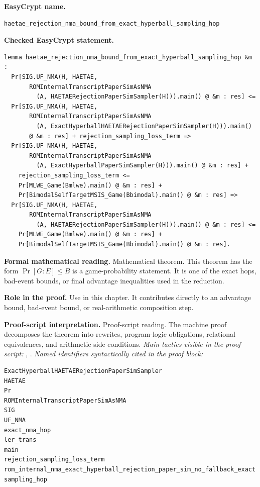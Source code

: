 \begin{formaltheorem}
\noindent\textbf{EasyCrypt name.}
\begin{lstlisting}[language=EasyCrypt,basicstyle=\ttfamily\scriptsize]
haetae_rejection_nma_bound_from_exact_hyperball_sampling_hop
\end{lstlisting}
\noindent\textbf{Checked EasyCrypt statement.}
\begin{lstlisting}[language=EasyCrypt,basicstyle=\ttfamily\scriptsize]
lemma haetae_rejection_nma_bound_from_exact_hyperball_sampling_hop &m :
  Pr[SIG.UF_NMA(H, HAETAE,
       ROMInternalTranscriptPaperSimAsNMA
         (A, HAETAERejectionPaperSimSampler(H))).main() @ &m : res] <=
  Pr[SIG.UF_NMA(H, HAETAE,
       ROMInternalTranscriptPaperSimAsNMA
         (A, ExactHyperballHAETAERejectionPaperSimSampler(H))).main()
       @ &m : res] + rejection_sampling_loss_term =>
  Pr[SIG.UF_NMA(H, HAETAE,
       ROMInternalTranscriptPaperSimAsNMA
         (A, ExactHyperballPaperSimSampler(H))).main() @ &m : res] +
    rejection_sampling_loss_term <=
    Pr[MLWE_Game(Bmlwe).main() @ &m : res] +
    Pr[BimodalSelfTargetMSIS_Game(Bbimodal).main() @ &m : res] =>
  Pr[SIG.UF_NMA(H, HAETAE,
       ROMInternalTranscriptPaperSimAsNMA
         (A, HAETAERejectionPaperSimSampler(H))).main() @ &m : res] <=
    Pr[MLWE_Game(Bmlwe).main() @ &m : res] +
    Pr[BimodalSelfTargetMSIS_Game(Bbimodal).main() @ &m : res].
\end{lstlisting}
\noindent\textbf{Formal mathematical reading.}
Mathematical theorem. This theorem has the form \(\Pr[G:E] \le B\) is a game-probability statement.  It is one of the exact hops, bad-event bounds, or final advantage inequalities used in the reduction.

\noindent\textbf{Role in the proof.}
Use in this chapter. It contributes directly to an advantage bound, bad-event bound, or real-arithmetic composition step.

\noindent\textbf{Proof-script interpretation.}
Proof-script reading. The machine proof decomposes the theorem into rewrites, program-logic obligations, relational equivalences, and arithmetic side conditions.
\emph{Main tactics visible in the proof script:} , .
\emph{Named identifiers syntactically cited in the proof block:}
\begin{lstlisting}[language=EasyCrypt,basicstyle=\ttfamily\scriptsize]
ExactHyperballHAETAERejectionPaperSimSampler
HAETAE
Pr
ROMInternalTranscriptPaperSimAsNMA
SIG
UF_NMA
exact_nma_hop
ler_trans
main
rejection_sampling_loss_term
rom_internal_nma_exact_hyperball_rejection_paper_sim_no_fallback_exact
sampling_hop
\end{lstlisting}

\end{formaltheorem}

